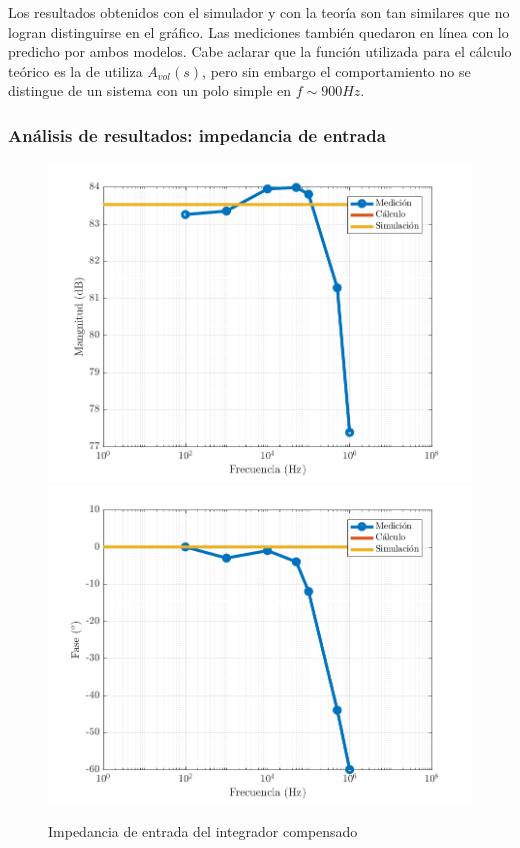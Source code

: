 \documentclass[../../main.tex]{subfiles}
\begin{document}
Los resultados obtenidos con el simulador y con la teor\'ia son tan similares que no logran distinguirse en el gr\'afico. Las mediciones tambi\'en quedaron en l\'inea con lo predicho por ambos modelos. Cabe aclarar que la funci\'on utilizada para el c\'alculo te\'orico es la de utiliza $A_{vol}(s)$, pero sin embargo el comportamiento no se distingue de un sistema con un polo simple en $f \sim 900Hz$.


\subsubsection{An\'alisis de resultados: impedancia de entrada}

\begin{figure}  [H]
	\centering
	\label{fig:icomp-zin}
	\includegraphics[scale=0.7]{fotos/tc_tp2_ej4_icomp_zin_mag.png}
	\includegraphics[scale=0.7]{fotos/tc_tp2_ej4_icomp_zin_fase.png}
	\caption{Impedancia de entrada del integrador compensado}
\end{figure}
\end{document}
